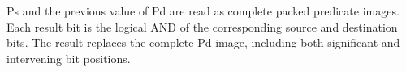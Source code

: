 Ps and the previous value of Pd are read as complete packed predicate images.
Each result bit is the logical AND of the corresponding source and destination
bits.  The result replaces the complete Pd image, including both significant
and intervening bit positions.
